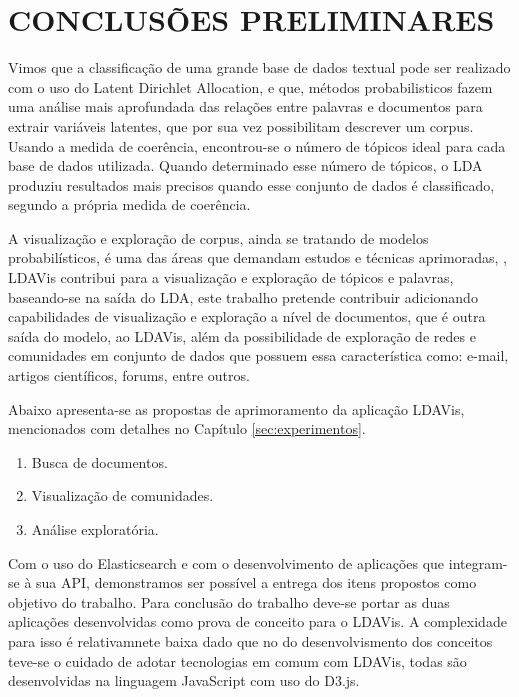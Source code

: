 \documentclass[12pt,a4paper]{article}
\begin{document}
\section{CONCLUSÕES PRELIMINARES} \label{sec:conclusoes-preliminares}

Vimos que a classificação de uma grande base de dados textual pode ser realizado com o uso do Latent Dirichlet Allocation, e que,
 métodos probabilisticos fazem uma análise mais aprofundada das relações entre palavras e documentos para extrair variáveis
 latentes, que por sua vez possibilitam descrever um corpus. Usando a medida de coerência, encontrou-se
 o número de tópicos ideal para cada base de dados utilizada. Quando determinado esse número de tópicos, 
 o LDA produziu resultados mais precisos quando esse conjunto de dados é classificado, segundo a própria medida de coerência.

A visualização e exploração de corpus, ainda se tratando de modelos probabilísticos, é uma das áreas que demandam estudos 
 e técnicas aprimoradas, \cite{blei2012probabilistic}, LDAVis contribui para a visualização e exploração de tópicos e palavras,
 baseando-se na saída do LDA, este trabalho pretende contribuir adicionando capabilidades de visualização
 e exploração a nível de documentos, que é outra saída do modelo, ao LDAVis, além da possibilidade de exploração de redes
 e comunidades em conjunto de dados que possuem essa característica como: e-mail, artigos científicos, forums, entre outros.

Abaixo apresenta-se as propostas de aprimoramento da aplicação LDAVis, mencionados com detalhes no Capítulo \ref{sec:experimentos}.

\begin{enumerate}
  \item Busca de documentos.
  \item Visualização de comunidades.
  \item Análise exploratória.
\end{enumerate}


Com o uso do Elasticsearch e com o desenvolvimento de aplicações que integram-se à sua API, demonstramos ser possível 
 a entrega dos itens propostos como objetivo do trabalho. Para conclusão do trabalho deve-se portar as duas aplicações
 desenvolvidas como prova de conceito para o LDAVis. A complexidade para isso é relativamnete baixa dado que  
 no do desenvolvismento dos conceitos teve-se o cuidado de adotar tecnologias em comum com LDAVis, todas são desenvolvidas
 na linguagem JavaScript com uso do D3.js.
\end{document}
